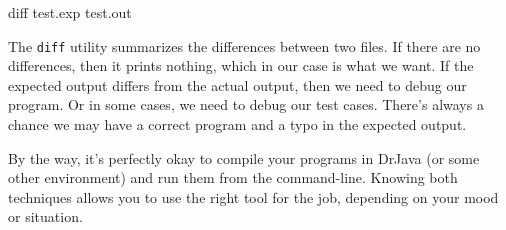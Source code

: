 \begin{stdout}
diff test.exp test.out
\end{stdout}

The {\tt diff} utility summarizes the differences between two files.
If there are no differences, then it prints nothing, which in our case is what we want.
If the expected output differs from the actual output, then we need to debug our program.
Or in some cases, we need to debug our test cases.
There's always a chance we may have a correct program and a typo in the expected output.

By the way, it's perfectly okay to compile your programs in DrJava (or some other environment) and run them from the command-line.
Knowing both techniques allows you to use the right tool for the job, depending on your mood or situation.
